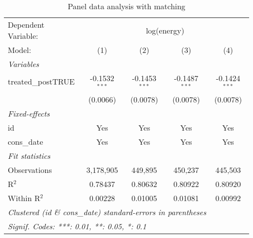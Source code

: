 
\begin{table}[htbp]
   \centering
   \caption{Panel data analysis with matching\label{tab:didmatch}}
   \begin{tabular}{lcccc}
      \tabularnewline\midrule\midrule
      Dependent Variable: & \multicolumn{4}{c}{log(energy)}\\
      Model:             & (1)             & (2)             & (3)             & (4)\\
      \midrule \emph{Variables} &   &   &   &  \\
      treated\_postTRUE & -0.1532$^{***}$ & -0.1453$^{***}$ & -0.1487$^{***}$ & -0.1424$^{***}$\\
                         & (0.0066)        & (0.0078)        & (0.0078)        & (0.0078)\\
      \midrule \emph{Fixed-effects} &   &   &   &  \\
      id                 & Yes             & Yes             & Yes             & Yes\\
      cons\_date        & Yes             & Yes             & Yes             & Yes\\
      \midrule \emph{Fit statistics} &   &   &   &  \\
      Observations       & 3,178,905       & 449,895         & 450,237         & 445,503\\
      R$^2$              & 0.78437         & 0.80632         & 0.80922         & 0.80920\\
      Within R$^2$       & 0.00228         & 0.01005         & 0.01081         & 0.00992\\
      \midrule\midrule\multicolumn{5}{l}{\emph{Clustered (id \& cons\_date) standard-errors in parentheses}}\\
      \multicolumn{5}{l}{\emph{Signif. Codes: ***: 0.01, **: 0.05, *: 0.1}}\\
   \end{tabular}
\end{table}


